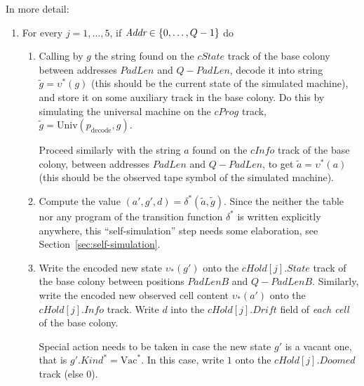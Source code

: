 \documentclass[12pt]{memoir}
\newcommand{\fld}[1]{\ensuremath{\textit{#1}}}
\def\B{B}
\newcommand{\Addr}{\fld{Addr}}
\newcommand{\cAddr}{\fld{cAddr}}
\newcommand{\Drift}{\fld{Drift}}
\newcommand{\Doomed}{\fld{Doomed}}
\newcommand{\cHold}{\fld{cHold}}
\newcommand{\Info}{\fld{Info}}
\newcommand{\cInfo}{\fld{cInfo}}
\newcommand{\Kind}{\fld{Kind}}
\newcommand{\cKind}{\fld{cKind}}
\newcommand{\cProg}{\fld{cProg}}
\newcommand{\State}{\fld{State}}
\newcommand{\cState}{\fld{cState}}
\newcommand{\decode}{\mathrm{decode}}
\newcommand{\Member}{\mathrm{Member}}
\newcommand{\PadLen}{\mathit{PadLen}}
\newcommand{\Un}{\mathrm{Univ}}
\newcommand{\Vacant}{\mathrm{Vac}}
\begin{document}
In more detail:
\begin{enumerate}

      \item For every \( j=1,\dots,5 \), if \( \Addr \in \set{0, \dots, Q-1} \) do

       \begin{enumerate}

          \item Calling by \( g \) the  string found on the \( \cState \) track of
            the base colony between addresses \( \PadLen \)
            and \( Q-\PadLen \), decode it into string \( \tilde g=\upsilon^{*}(g) \)
            (this should be the current state of the simulated machine), and
            store it on some auxiliary track in the base colony.
            Do this by simulating the universal machine on the \( \cProg \) track,
            \( \tilde g = \Un(p_{\decode}, g) \).

            Proceed similarly with the string \( a \) found on the \( \cInfo \)
            track of the base colony, between addresses \( \PadLen \)
            and \( Q-\PadLen \), to get \( \tilde a = \upsilon^{*}(a) \)
            (this should be the observed tape symbol of the simulated machine).

          \item \label{i:comp.trans}
           Compute the value \( (a',g',d)=\delta^{*}(\tilde a, \tilde g) \).
Since the neither the table nor any program of the transition 
function \( \delta^{*} \) is written explicitly anywhere, this ``self-simulation'' step needs
some elaboration, see Section~\ref{sec:self-simulation}.

            \item\label{i:comp.write}
              Write the encoded new state \( \upsilon_{*}(g') \) onto the
              \( \cHold[j].\State \) track of the base colony between positions
              \( \PadLen\B \) and \( Q-\PadLen\B \).
              Similarly, write the encoded new observed cell
              content \( \upsilon_{*}(a') \) onto the \( \cHold[j].\Info \) track.
              Write \( d \) into the \( \cHold[j].\Drift \) field of \emph{each cell} of
              the base colony.

              Special action needs to be taken in case 
              the new state \( g' \) is a vacant one, that is 
              \( g'.\Kind^{*}=\Vacant^{*} \).
              In this case, write \( 1 \) onto the \( \cHold[j].\Doomed \) track (else 0).


\end{enumerate}
\end{enumerate}
\end{document}

